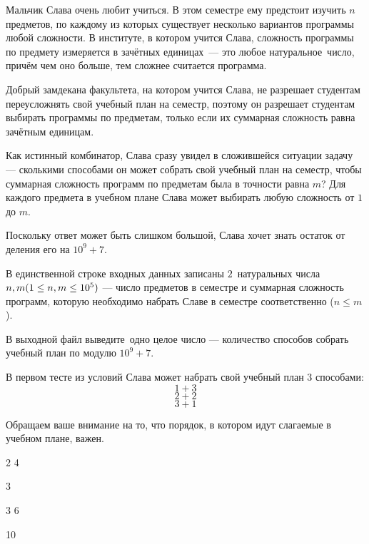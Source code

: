 
Мальчик Слава очень любит учиться. В этом семестре ему предстоит изучить $n$ предметов, по каждому из которых существует несколько вариантов программы любой сложности. В институте, в котором учится Слава, сложность программы по предмету измеряется в зачётных единицах — это любое натуральное число, причём чем оно больше, тем сложнее считается программа.

Добрый замдекана факультета, на котором учится Слава, не разрешает студентам переусложнять свой учебный план на семестр, поэтому он разрешает студентам выбирать программы по предметам, только если их суммарная сложность равна  зачётным единицам.

Как истинный комбинатор, Слава сразу увидел в сложившейся ситуации задачу — сколькими способами он может собрать свой учебный план на семестр, чтобы суммарная сложность программ по предметам была в точности равна $m$? Для каждого предмета в учебном плане Слава может выбирать любую сложность от $1$ до $m$.

Поскольку ответ может быть слишком большой, Слава хочет знать остаток от деления его на $10^9 + 7$.


В единственной строке входных данных записаны $2$ натуральных числа $n, m\space (1\leq n, m\leq 10^5)$ — число предметов в семестре и суммарная сложность программ, которую необходимо набрать Славе в семестре соответственно ($n \leq m$).  
\outputfmtSection

В выходной файл выведите одно целое число — количество способов собрать учебный план по модулю $10^9 + 7$.

\explanationSection

В первом тесте из условий Слава может набрать свой учебный план $3$ способами:
$$1+3$$ $$2+2$$ $$3+1$$

Обращаем ваше внимание на то, что порядок, в котором идут слагаемые в учебном плане, важен.


\begin{myverbbox}[\small]{\vinput}
    2 4
\end{myverbbox}

\begin{myverbbox}[\small]{\voutput}
    3
\end{myverbbox}


\begin{myverbbox}[\small]{\vinput}
    3 6
\end{myverbbox}

\begin{myverbbox}[\small]{\voutput}
    10
\end{myverbbox}


